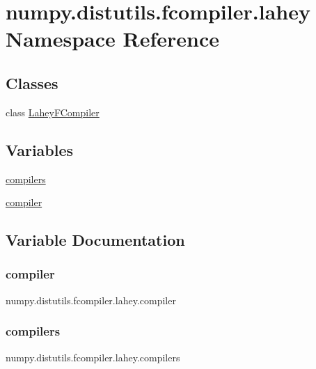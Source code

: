 \hypertarget{namespacenumpy_1_1distutils_1_1fcompiler_1_1lahey}{}\section{numpy.\+distutils.\+fcompiler.\+lahey Namespace Reference}
\label{namespacenumpy_1_1distutils_1_1fcompiler_1_1lahey}
\subsection*{Classes}
\begin{DoxyCompactItemize}
\item 
class \hyperlink{classnumpy_1_1distutils_1_1fcompiler_1_1lahey_1_1LaheyFCompiler}{Lahey\+F\+Compiler}
\end{DoxyCompactItemize}
\subsection*{Variables}
\begin{DoxyCompactItemize}
\item 
\hyperlink{namespacenumpy_1_1distutils_1_1fcompiler_1_1lahey_ac60273ccc43b011dd98ff466144be8cd}{compilers}
\item 
\hyperlink{namespacenumpy_1_1distutils_1_1fcompiler_1_1lahey_a1223db05832c7c47d7a17acc760886c8}{compiler}
\end{DoxyCompactItemize}


\subsection{Variable Documentation}
\mbox{\label{namespacenumpy_1_1distutils_1_1fcompiler_1_1lahey_a1223db05832c7c47d7a17acc760886c8}} 
\subsubsection{\texorpdfstring{compiler}{compiler}}
{\footnotesize\ttfamily numpy.\+distutils.\+fcompiler.\+lahey.\+compiler}

\mbox{\label{namespacenumpy_1_1distutils_1_1fcompiler_1_1lahey_ac60273ccc43b011dd98ff466144be8cd}} 
\subsubsection{\texorpdfstring{compilers}{compilers}}
{\footnotesize\ttfamily numpy.\+distutils.\+fcompiler.\+lahey.\+compilers}


